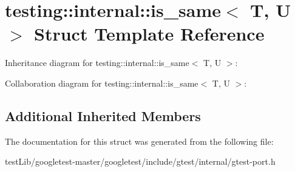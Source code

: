 \hypertarget{structtesting_1_1internal_1_1is__same}{}\section{testing\+:\+:internal\+:\+:is\+\_\+same$<$ T, U $>$ Struct Template Reference}
\label{structtesting_1_1internal_1_1is__same}


Inheritance diagram for testing\+:\+:internal\+:\+:is\+\_\+same$<$ T, U $>$\+:


Collaboration diagram for testing\+:\+:internal\+:\+:is\+\_\+same$<$ T, U $>$\+:
\subsection*{Additional Inherited Members}


The documentation for this struct was generated from the following file\+:\begin{DoxyCompactItemize}
\item 
test\+Lib/googletest-\/master/googletest/include/gtest/internal/gtest-\/port.\+h\end{DoxyCompactItemize}

